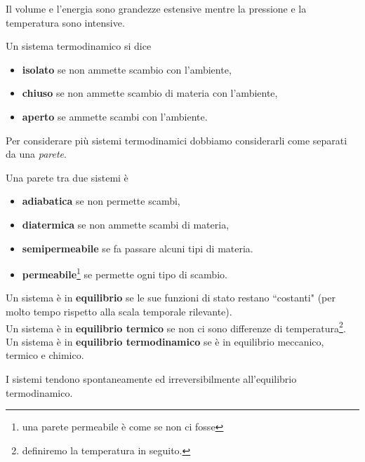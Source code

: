 \begin{example}
Il volume e l'energia sono grandezze estensive mentre la pressione e la temperatura sono intensive.
\end{example}

\begin{definition}
Un sistema termodinamico si dice 
\begin{itemize}
\item \textbf{isolato} se non ammette scambio con l'ambiente,
\item \textbf{chiuso} se non ammette scambio di materia con l'ambiente,
\item \textbf{aperto} se ammette scambi con l'ambiente.
\end{itemize}
\end{definition}

Per considerare pi\`u sistemi termodinamici dobbiamo considerarli come separati da una \textit{parete}.

\begin{definition}
Una parete tra due sistemi \`e
\begin{itemize}
\item \textbf{adiabatica} se non permette scambi,
\item \textbf{diatermica} se non ammette scambi di materia,
\item \textbf{semipermeabile} se fa passare alcuni tipi di materia.
\item \textbf{permeabile}\footnote{una parete permeabile \`e come se non ci fosse} se permette ogni tipo di scambio.
\end{itemize}
\end{definition}

\begin{definition}[Equilibrio]
Un sistema \`e in \textbf{equilibrio} se le sue funzioni di stato restano ``costanti" (per molto tempo rispetto alla scala temporale rilevante).\\
Un sistema \`e in \textbf{equilibrio termico} se non ci sono differenze di temperatura\footnote{definiremo la temperatura in seguito.}.\\
Un sistema \`e in \textbf{equilibrio termodinamico} se \`e in equilibrio meccanico, termico e chimico.
\end{definition}

\begin{remark}
I sistemi tendono spontaneamente ed irreversibilmente all'equilibrio termodinamico.
\end{remark}

